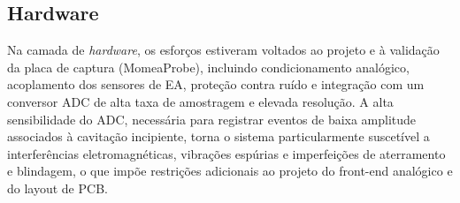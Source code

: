 \subsection{Hardware}
Na camada de \textit{hardware}, os esforços estiveram voltados ao projeto e à validação da placa de captura (MomeaProbe), incluindo condicionamento analógico, acoplamento dos sensores de EA, proteção contra ruído e integração com um conversor ADC de alta taxa de amostragem e elevada resolução. A alta sensibilidade do ADC, necessária para registrar eventos de baixa amplitude associados à cavitação incipiente, torna o sistema particularmente suscetível a interferências eletromagnéticas, vibrações espúrias e imperfeições de aterramento e blindagem, o que impõe restrições adicionais ao projeto do front-end analógico e do layout de PCB.

%
%
%
